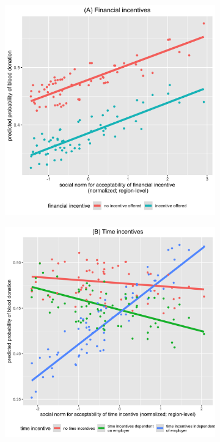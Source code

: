 \documentclass[AER]{AEA}
\begin{document}
\begin{figure}[hbt!]
\begin{subfigure}{.48\textwidth}
  \centering
  \includegraphics[width=\linewidth]{images/pred_region_level_norms_financial.png}  
\end{subfigure}
\begin{subfigure}{.48\textwidth}
  \centering
  \includegraphics[width=\linewidth]{images/pred_region_level_norms_time.png}  

\end{subfigure}
\end{figure}
\end{document}
